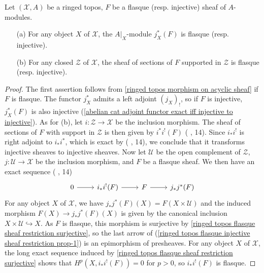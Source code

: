 \begin{proposition}\label{ringed topos flasque injective sheaf restriction prop}
Let $(\mathcal{X},A)$ be a ringed topos, $F$ be a flasque (resp. injective) sheaf of $A$-modules.
\begin{enumerate}
\item[(a)] For any object $X$ of $\mathcal{X}$, the $A|_X$-module $j_X^*(F)$ is flasque (resp. injective).
\item[(b)] For any closed $\mathcal{Z}$ of $\mathcal{X}$, the sheaf of sections of $F$ supported in $\mathcal{Z}$ is flasque (resp. injective).
\end{enumerate}
\end{proposition}
\begin{proof}
The first assertion follows from \cref{ringed topos morphism on acyclic sheaf} if $F$ is flasque. The functor $j_X^*$ admits a left adjoint $(j_X)_!$, so if $F$ is injective, $j_X^*(F)$ is also injective (\cref{abelian cat adjoint functor exact iff injective to injective}). As for (b), let $i:\mathcal{Z}\to \mathcal{X}$ be the inclusion morphism. The sheaf of sections of $F$ with support in $\mathcal{Z}$ is then given by $i^*i^!(F)$ (\cite{SGA4-1} , 14). Since $i_*i^!$ is right adjoint to $i_*i^*$, which is exact by (\cite{SGA4-1} , 14), we conclude that it transforms injective sheaves to injective sheaves. Now let $\mathcal{U}$ be the open complement of $\mathcal{Z}$, $j:\mathscr{U}\to \mathcal{X}$ be the inclusion morphism, and $F$ be a flasque sheaf. We then have an exact sequence (\cite{SGA4-1} , 14)
\begin{equation}\label{ringed topos flasque injective sheaf restriction prop-1}
\begin{tikzcd}
0\ar[r]&i_*i^!(F)\ar[r]&F\ar[r]&j_*j^*(F)
\end{tikzcd}
\end{equation}
For any object $X$ of $\mathcal{X}$, we have $j_*j^*(F)(X)=F(X\times\mathcal{U})$ and the induced morphism $F(X)\to j_*j^*(F)(X)$ is given by the canonical inclusion $X\times\mathcal{U}\hookrightarrow X$. As $F$ is flasque, this morphism is surjective by \cref{ringed topos flasque sheaf restriction surjective}, so the last arrow of (\ref{ringed topos flasque injective sheaf restriction prop-1}) is an epimorphism of presheaves. For any object $X$ of $\mathcal{X}$, the long exact sequence induced by \cref{ringed topos flasque sheaf restriction surjective} shows that $H^p(X,i_*i^!(F))=0$ for $p>0$, so $i_*i^!(F)$ is flasque.
\end{proof}

